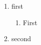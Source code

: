 \documentclass{article}
\begin{document}
\vspace*{\fill} \vspace*{-5ex}

\begin{enumerate}
     \item first
     \begin{enumerate}
         \item First
     \end{enumerate}
     \item second
\end{enumerate}

\vspace*{\fill}
\end{document}
